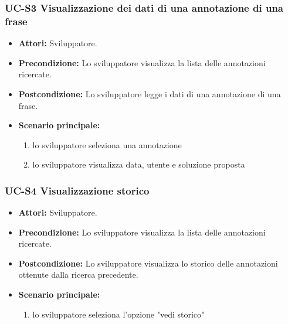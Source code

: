 	\subsubsection{UC-S3 Visualizzazione dei dati di una annotazione di una frase}
		\begin{itemize}
			\item \textbf{Attori:} Sviluppatore.
			\item \textbf{Precondizione:} Lo sviluppatore visualizza la lista delle annotazioni ricercate.
			\item \textbf{Postcondizione:} Lo sviluppatore legge i dati di una annotazione di una frase.
			\item \textbf{Scenario principale:}
				\begin{enumerate}
					\item lo sviluppatore seleziona una annotazione
					\item lo sviluppatore visualizza data, utente e soluzione proposta
				\end{enumerate}
		\end{itemize}
	
	\subsubsection{UC-S4 Visualizzazione storico}		
		\begin{itemize}
			\item \textbf{Attori:} Sviluppatore.
			\item \textbf{Precondizione:} Lo sviluppatore visualizza la lista delle annotazioni ricercate.
			\item \textbf{Postcondizione:} Lo sviluppatore visualizza lo storico delle annotazioni ottenute dalla ricerca precedente.
			\item \textbf{Scenario principale:}
			\begin{enumerate}
				\item lo sviluppatore seleziona l'opzione "vedi storico"
			\end{enumerate}
		\end{itemize}	
		
